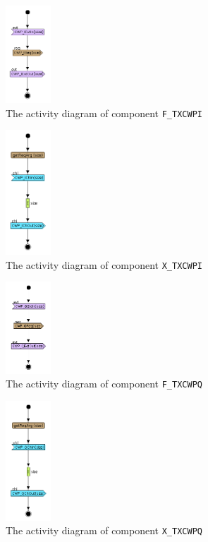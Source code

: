 \documentclass{llncs}
\begin{document}
%
\begin{figure}[!htbp]
	\centering
	\includegraphics[width=0.15\textwidth]{figures/screenshot/F_CWP_I.png}
	\caption{The activity diagram of component \texttt{F\_TXCWPI}}
	\label{fig:FCWPI}
\end{figure}
%
\begin{figure}[!htbp]
	\centering
	\includegraphics[width=0.15\textwidth]{figures/screenshot/X_CWP_I.png}
	\caption{The activity diagram of component \texttt{X\_TXCWPI}}
	\label{fig:XCWPI}
\end{figure}
%
\begin{figure}[!htbp]
	\centering
	\includegraphics[width=0.15\textwidth]{figures/screenshot/F_CWP_Q.png}
	\caption{The activity diagram of component \texttt{F\_TXCWPQ}}
	\label{fig:FCWPQ}
\end{figure}
%
\begin{figure}[!htbp]
	\centering
	\includegraphics[width=0.15\textwidth]{figures/screenshot/X_CWP_Q.png}
	\caption{The activity diagram of component \texttt{X\_TXCWPQ}}
	\label{fig:XCWPQ}
\end{figure}
\end{document}
